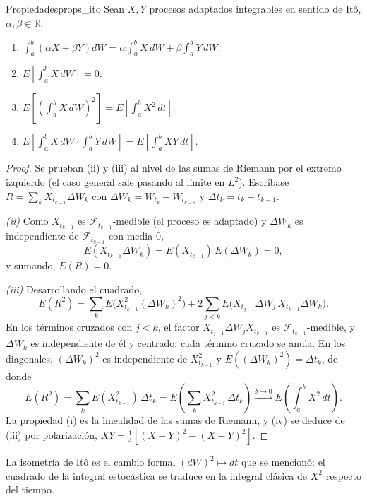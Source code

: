 \documentclass[11pt, a4paper]{article}
\begin{document}
\begin{proposicion}{Propiedades}{props_ito}
Sean $X, Y$ procesos adaptados integrables en sentido de Itô, $\alpha, \beta \in \mathbb{R}$:
\begin{enumerate}
    \item $\int_a^b (\alpha X + \beta Y) dW = \alpha \int_a^b X \, dW + \beta \int_a^b Y \, dW$.
    \item $\displaystyle E\!\left[\int_a^b X \, dW\right] = 0$.
    \item $\displaystyle E\!\left[\left(\int_a^b X \, dW\right)^2 \right] = E\!\left[\int_a^b X^2
    \, dt\right]$.
    \item $\displaystyle E\!\left[\int_a^b X \, dW \cdot \int_a^b Y \, dW\right] =
    E\!\left[\int_a^b XY \, dt\right]$.
\end{enumerate}
\end{proposicion}

\begin{proof}
Se prueban (ii) y (iii) al nivel de las sumas de Riemann por el extremo izquierdo (el caso
general sale pasando al límite en $L^2$). Escríbase $R = \sum_k X_{t_{k-1}} \Delta W_k$ con
$\Delta W_k = W_{t_k} - W_{t_{k-1}}$ y $\Delta t_k = t_k - t_{k-1}$.

\textit{(ii)} Como $X_{t_{k-1}}$ es $\mathcal{F}_{t_{k-1}}$-medible (el proceso es adaptado) y
$\Delta W_k$ es independiente de $\mathcal{F}_{t_{k-1}}$ con media $0$,
$$ E(X_{t_{k-1}} \Delta W_k) = E(X_{t_{k-1}}) \, E(\Delta W_k) = 0, $$
y sumando, $E(R) = 0$.

\textit{(iii)} Desarrollando el cuadrado,
$$ E(R^2) = \sum_k E\big(X_{t_{k-1}}^2 (\Delta W_k)^2\big) + 2 \sum_{j < k}
E\big(X_{t_{j-1}} \Delta W_j \, X_{t_{k-1}} \Delta W_k\big). $$
En los términos cruzados con $j < k$, el factor $X_{t_{j-1}} \Delta W_j X_{t_{k-1}}$ es
$\mathcal{F}_{t_{k-1}}$-medible, y $\Delta W_k$ es independiente de él y centrado: cada
término cruzado se anula. En los diagonales, $(\Delta W_k)^2$ es independiente de
$X_{t_{k-1}}^2$ y $E((\Delta W_k)^2) = \Delta t_k$, de donde
$$ E(R^2) = \sum_k E(X_{t_{k-1}}^2) \, \Delta t_k = E\!\left( \sum_k X_{t_{k-1}}^2 \, \Delta
t_k \right) \xrightarrow{\delta \to 0} E\!\left( \int_a^b X^2 \, dt \right). $$
La propiedad (i) es la linealidad de las sumas de Riemann, y (iv) se deduce de (iii) por
polarización, $XY = \tfrac{1}{4} \left[ (X + Y)^2 - (X - Y)^2 \right]$.
\end{proof}

\obs La isometría de Itô es el cambio formal $(dW)^2 \mapsto dt$ que se mencionó: el cuadrado
de la integral estocástica se traduce en la integral clásica de $X^2$ respecto del tiempo.
\end{document}
